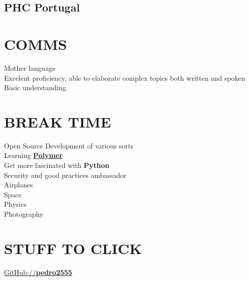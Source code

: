 \documentclass[letterpaper]{deedy-resume} %
\begin{document}
\begin{minipage}[t]{0.33\textwidth}
\subsection{PHC Portugal}

\sectionspace

\section{COMMS}
Mother language\\
Excelent proficiency, able to elaborate complex topics both written and spoken\\
Basic understanding.

\section{BREAK TIME}
Open Source Development of various sorts\\
Learning \textbf{\href{https://www.polymer-project.org/}{Polymer}}\\
Get more fascinated with \textbf{Python}\\
Security and good practices ambassador\\
Airplanes\\
Space\\
Physics \\
Photography\\

\section{STUFF TO CLICK}
\href{https://github.com/pedro2555}{GitHub://\textbf{pedro2555}}\\

\end{minipage}
\hfill
%
%
\end{document}
